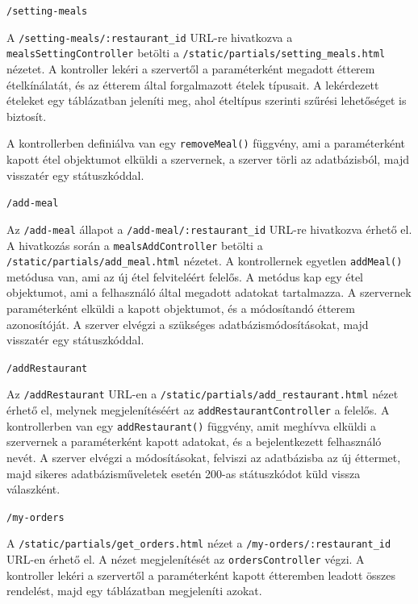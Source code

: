 \bigskip

\noindent \texttt{/setting-meals}

A \texttt{/setting-meals/:restaurant\_id} URL-re hivatkozva a \texttt{mealsSettingController} betölti a \texttt{/static/partials/setting\_meals.html} nézetet. A kontroller lekéri a szervertől a paraméterként megadott étterem ételkínálatát, és az étterem által forgalmazott ételek típusait. A lekérdezett ételeket egy táblázatban jeleníti meg, ahol ételtípus szerinti szűrési lehetőséget is biztosít.

A kontrollerben definiálva van egy \texttt{removeMeal()} függvény, ami a paraméterként kapott étel objektumot elküldi a szervernek, a szerver törli az adatbázisból, majd visszatér egy státuszkóddal.

\bigskip

\noindent \texttt{/add-meal}

Az \texttt{/add-meal} állapot a \texttt{/add-meal/:restaurant\_id} URL-re hivatkozva érhető el. A hivatkozás során a \texttt{mealsAddController} betölti a \texttt{/static/partials/add\_meal.html} nézetet. A kontrollernek egyetlen \texttt{addMeal()} metódusa van, ami az új étel felviteléért felelős. A metódus kap egy étel objektumot, ami a felhasználó által megadott adatokat tartalmazza. A szervernek paraméterként elküldi a kapott objektumot, és a módosítandó étterem azonosítóját. A szerver elvégzi a szükséges adatbázismódosításokat, majd visszatér egy státuszkóddal.

\bigskip

\noindent \texttt{/addRestaurant}

Az \texttt{/addRestaurant} URL-en a \texttt{/static/partials/add\_restaurant.html} nézet érhető el, melynek megjelenítéséért az \texttt{addRestaurantController} a felelős. A kontrollerben van egy \texttt{addRestaurant()} függvény, amit meghívva elküldi a szervernek a paraméterként kapott adatokat, és a bejelentkezett felhasználó nevét. A szerver elvégzi a módosításokat, felviszi az adatbázisba az új éttermet, majd sikeres adatbázisműveletek esetén 200-as státuszkódot küld vissza válaszként.

\bigskip

\noindent \texttt{/my-orders}

A \texttt{/static/partials/get\_orders.html} nézet a \texttt{/my-orders/:restaurant\_id} URL-en érhető el. A nézet megjelenítését az \texttt{ordersController} végzi. A kontroller lekéri a szervertől a paraméterként kapott étteremben leadott összes rendelést, majd egy táblázatban megjeleníti azokat.


